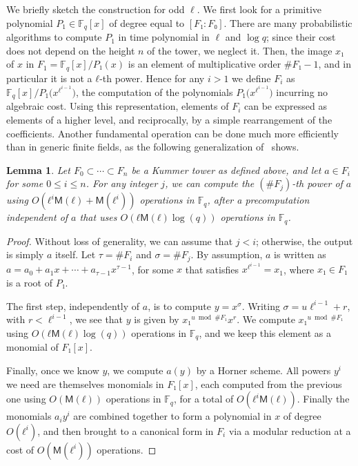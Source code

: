 \documentclass{lms}
\newtheorem{lem}[thm]{Lemma}
\def\cout#1{\mathsf{#1}}
\newcommand{\F}{\mathbb{F}}
\newcommand{\MM}{\cout{M}}
\begin{document}
We briefly sketch the construction for odd $\ell$. We first look for a
primitive polynomial $P_1∈\F_q[x]$ of degree equal to $[F₁:F₀]$. There
are many probabilistic algorithms to compute $P_1$ in time polynomial
in $\ell$ and $\log q$; since their cost does not depend on the height
$n$ of the tower, we neglect it. Then, the image $x₁$ of $x$ in
$F_1=\F_q[x]/P₁(x)$ is an element of multiplicative order $\#F₁-1$,
and in particular it is not a $ℓ$-th power. Hence for any $i>1$ we
define $F_i$ as $\F_q[x]/P_1\bigl(x^{ℓ^{i-1}}\bigr)$, the computation
of the polynomials $P_1\bigl(x^{ℓ^{i-1}}\bigr)$ incurring no algebraic
cost. Using this representation, elements of $F_i$ can be expressed as
elements of a higher level, and reciprocally, by a simple
rearrangement of the coefficients. Another fundamental operation can
be done much more efficiently than in generic finite fields, as the
following generalization of~\cite[\S~2.3]{DoSc12} shows.

\begin{lem}\label{lemma:frob-ell}
  Let $F_0⊂\cdots⊂F_n$ be a Kummer tower as defined above, and let
  $a∈F_i$ for some $0≤i≤n$. For any integer $j$, we can compute the
  $(\#F_j)$-th power of $a$ using $O(ℓ^i\MM(ℓ) + \MM(ℓ^i))$ operations
  in $\F_q$, after a precomputation independent of $a$ that uses
  $O(ℓ\MM(ℓ)\log(q))$ operations in $\F_q$.
\end{lem}
\begin{proof}
  Without loss of generality, we can assume that $j<i$; otherwise, the
  output is simply $a$ itself. Let $τ=\#F_i$ and $σ=\#F_j$. By
  assumption, $a$ is written as
  $a =a_0 + a_1 x + \cdots + a_{τ-1} x^{τ-1}$, for some $x$ that
  satisfies $x^{\ell^{i-1}}=x_1$, where $x₁∈F₁$ is a root of $P₁$.

  The first step, independently of $a$, is to compute $y=x^σ$. Writing
  $σ = u \ell^{i-1} + r$, with $r < \ell^{i-1}$, we see that $y$ is
  given by $x₁^{u \bmod \#F₁}x^r$. We compute $x₁^{u\bmod\#F₁}$ using
  $O(ℓ\MM(ℓ)\log(q))$ operations in $\F_q$, and we keep this element
  as a monomial of $F₁[x]$.

  Finally, once we know $y$, we compute $a(y)$ by a Horner scheme. All
  powers $y^i$ we need are themselves monomials in $F₁[x]$, each
  computed from the previous one using $O(\MM(ℓ))$ operations in
  $\F_q$, for a total of $O(ℓ^i\MM(ℓ))$. Finally the monomials
  $a_iy^i$ are combined together to form a polynomial in $x$ of degree
  $O(ℓ^i)$, and then brought to a canonical form in $F_i$ via a
  modular reduction at a cost of $O(\MM(ℓ^i))$ operations.
\end{proof}
\end{document}
